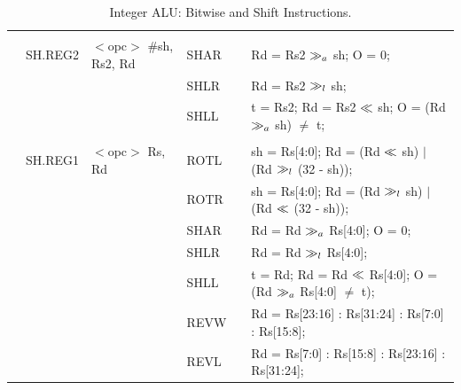 \begin{table}
\begin{subtable}{\linewidth}
\begin{center}
\begin{tabular}{llllll}
                   &                   &                                       &                   &                   &                                                                               \\
                   & SH.REG2           & $<$opc$>$ \#sh, Rs2, Rd               & SHAR              & \flags{!***}      & Rd = Rs2 $\gg_a$ sh; O = 0;                                                    \\
                   &                   &                                       & SHLR              & \flags{-***}      & Rd = Rs2 $\gg_l$ sh;                                                           \\
                   &                   &                                       & SHLL              & \flags{!***}      & t = Rs2; Rd = Rs2 $\ll$ sh;  O = (Rd $\gg_a$ sh) $\ne$ t;                     \\
                   &                   &                                       &                   &                   &                                                                               \\
                   & SH.REG1           & $<$opc$>$ Rs, Rd                      & ROTL              & \flags{-***}      & sh = Rs[4:0]; Rd = (Rd $\ll$ sh) $\mid$ (Rd $\gg_l$ (32 - sh));               \\
                   &                   &                                       & ROTR              & \flags{-***}      & sh = Rs[4:0]; Rd = (Rd $\gg_l$ sh) $\mid$ (Rd $\ll$ (32 - sh));               \\
                   &                   &                                       & SHAR              & \flags{!***}      & Rd = Rd $\gg_a$ Rs[4:0]; O = 0;                                                \\
                   &                   &                                       & SHLR              & \flags{-***}      & Rd = Rd $\gg_l$ Rs[4:0];                                                       \\
                   &                   &                                       & SHLL              & \flags{!***}      & t = Rd; Rd = Rd $\ll$ Rs[4:0]; O = (Rd $\gg_a$ Rs[4:0] $\ne$ t);              \\
                   &                   &                                       & REVW              & \flags{----}      & Rd = Rs[23:16] : Rs[31:24] : Rs[7:0] : Rs[15:8];                              \\
                   &                   &                                       & REVL              & \flags{----}      & Rd = Rs[7:0] : Rs[15:8] : Rs[23:16] : Rs[31:24];                              \\ \hline
\end{tabular}
\end{center}
\captionsetup{font=scriptsize, labelfont=scriptsize}
\caption{Integer ALU: Bitwise and Shift Instructions.}
\end{subtable}


\end{table}
